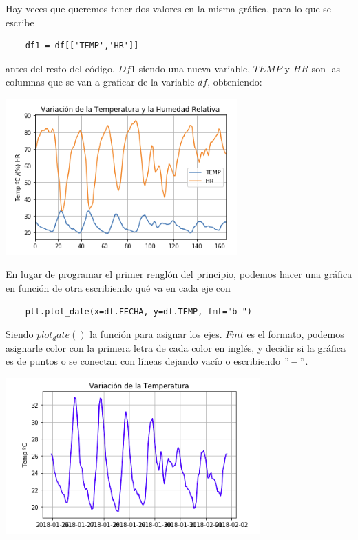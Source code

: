 \documentclass{article}
\begin{document}
	Hay veces que queremos tener dos valores en la misma gráfica, para lo que se escribe
    
    \begin{verbatim}
    df1 = df[['TEMP','HR']]
    \end{verbatim}
    
    antes del resto del código. $Df1$ siendo una nueva variable, $TEMP$ y $HR$ son las columnas que se van a graficar de la variable $df$, obteniendo:

	\begin{center}
    \includegraphics[height=6cm]{con_dos.png}
    \end{center}
    
    En lugar de programar el primer renglón del principio, podemos hacer una gráfica en función de otra escribiendo qué va en cada eje con 
    
    \begin{verbatim}
    plt.plot_date(x=df.FECHA, y=df.TEMP, fmt="b-")
    \end{verbatim}
    
    Siendo $plot_date()$ la función para asignar los ejes. $Fmt$ es el formato, podemos asignarle color con la primera letra de cada color en inglés, y decidir si la gráfica es de puntos o se conectan con líneas dejando vacío o escribiendo $"-"$.
    
    \begin{center}
    \includegraphics[height=6cm]{ejesxy.png}
    \end{center}
    
\end{document}
